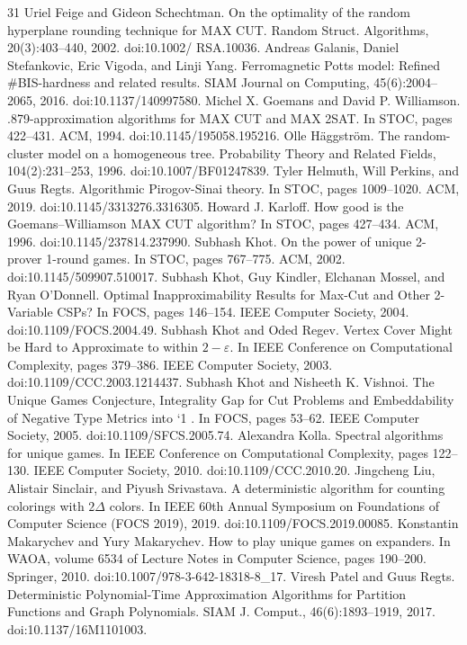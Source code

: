 \documentclass[10pt,a4paper]{article}
\theoremstyle{definition}
\begin{document}
\begin{thebibliography}{31}
Uriel Feige and Gideon Schechtman. On the optimality of the random hyperplane rounding technique for MAX CUT. Random Struct. Algorithms, 20(3):403–440, 2002. doi:10.1002/ RSA.10036.
Andreas Galanis, Daniel Stefankovic, Eric Vigoda, and Linji Yang. Ferromagnetic Potts model: Refined \#BIS-hardness and related results. SIAM Journal on Computing, 45(6):2004–2065, 2016. doi:10.1137/140997580.
Michel X. Goemans and David P. Williamson. .879-approximation algorithms for MAX CUT and MAX 2SAT. In STOC, pages 422–431. ACM, 1994. doi:10.1145/195058.195216.
Olle Häggström. The random-cluster model on a homogeneous tree. Probability Theory and Related Fields, 104(2):231–253, 1996. doi:10.1007/BF01247839.
Tyler Helmuth, Will Perkins, and Guus Regts. Algorithmic Pirogov-Sinai theory. In STOC, pages 1009–1020. ACM, 2019. doi:10.1145/3313276.3316305.
Howard J. Karloff. How good is the Goemans–Williamson MAX CUT algorithm? In STOC, pages 427–434. ACM, 1996. doi:10.1145/237814.237990.
Subhash Khot. On the power of unique 2-prover 1-round games. In STOC, pages 767–775. ACM, 2002. doi:10.1145/509907.510017.
Subhash Khot, Guy Kindler, Elchanan Mossel, and Ryan O’Donnell. Optimal Inapproximability Results for Max-Cut and Other 2-Variable CSPs? In FOCS, pages 146–154. IEEE Computer Society, 2004. doi:10.1109/FOCS.2004.49.
Subhash Khot and Oded Regev. Vertex Cover Might be Hard to Approximate to within $2-\varepsilon$. In IEEE Conference on Computational Complexity, pages 379–386. IEEE Computer Society, 2003. doi:10.1109/CCC.2003.1214437.
Subhash Khot and Nisheeth K. Vishnoi. The Unique Games Conjecture, Integrality Gap for Cut Problems and Embeddability of Negative Type Metrics into `1 . In FOCS, pages 53–62. IEEE Computer Society, 2005. doi:10.1109/SFCS.2005.74.
Alexandra Kolla. Spectral algorithms for unique games. In IEEE Conference on Computational Complexity, pages 122–130. IEEE Computer Society, 2010. doi:10.1109/CCC.2010.20.
Jingcheng Liu, Alistair Sinclair, and Piyush Srivastava. A deterministic algorithm for counting colorings with $2\Delta$ colors. In IEEE 60th Annual Symposium on Foundations of Computer Science (FOCS 2019), 2019. doi:10.1109/FOCS.2019.00085.
Konstantin Makarychev and Yury Makarychev. How to play unique games on expanders. In WAOA, volume 6534 of Lecture Notes in Computer Science, pages 190–200. Springer, 2010. doi:10.1007/978-3-642-18318-8\_17.
Viresh Patel and Guus Regts. Deterministic Polynomial-Time Approximation Algorithms for Partition Functions and Graph Polynomials. SIAM J. Comput., 46(6):1893–1919, 2017. doi:10.1137/16M1101003.

\end{thebibliography}
\end{document}
